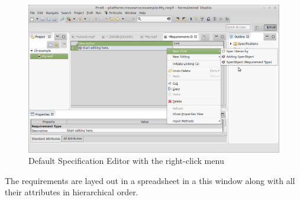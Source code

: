 \begin{figure}[!h]
  \centering
  \includegraphics[width=\linewidth]{../rmf-images/default_spec_view.png}
  \caption{Default Specification Editor with the right-click menu}
  \label{fig:default specification editor}
\end{figure}
The requirements are layed out in a spreadsheet in a this window along with all their attributes in hierarchical order.

